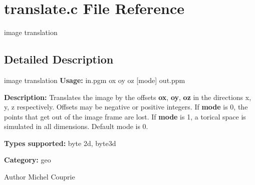 \section{translate.c File Reference}
\label{translate_8c}


image translation  




\subsection{Detailed Description}
image translation {\bfseries Usage:} in.pgm ox oy oz [mode] out.ppm

{\bfseries Description:} Translates the image by the offsets {\bfseries ox}, {\bfseries oy}, {\bfseries oz} in the directions x, y, z respectively. Offsets may be negative or positive integers. If {\bfseries mode} is 0, the points that get out of the image frame are lost. If {\bfseries mode} is 1, a torical space is simulated in all dimensions. Default mode is 0.

{\bfseries Types supported:} byte 2d, byte3d

{\bfseries Category:} geo

\begin{DoxyAuthor}{Author}
Michel Couprie 
\end{DoxyAuthor}
